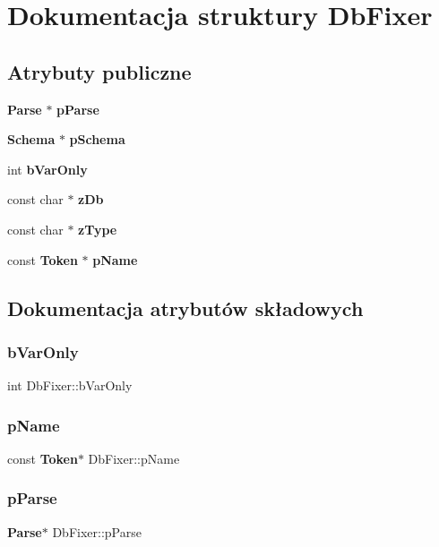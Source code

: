 \section{Dokumentacja struktury Db\+Fixer}
\label{struct_db_fixer}
\subsection*{Atrybuty publiczne}
\begin{DoxyCompactItemize}
\item 
\textbf{ Parse} $\ast$ \textbf{ p\+Parse}
\item 
\textbf{ Schema} $\ast$ \textbf{ p\+Schema}
\item 
int \textbf{ b\+Var\+Only}
\item 
const char $\ast$ \textbf{ z\+Db}
\item 
const char $\ast$ \textbf{ z\+Type}
\item 
const \textbf{ Token} $\ast$ \textbf{ p\+Name}
\end{DoxyCompactItemize}


\subsection{Dokumentacja atrybutów składowych}
\mbox{\label{struct_db_fixer_aebd8549176b84c8c71069ed4d77ad6af}} 
\subsubsection{bVarOnly}
{\footnotesize\ttfamily int Db\+Fixer\+::b\+Var\+Only}

\mbox{\label{struct_db_fixer_aedee20e10de7337651b84656ee81b39c}} 
\subsubsection{pName}
{\footnotesize\ttfamily const \textbf{ Token}$\ast$ Db\+Fixer\+::p\+Name}

\mbox{\label{struct_db_fixer_ac5c9b8bca3b05a66faea11dd998bf6f6}} 
\subsubsection{pParse}
{\footnotesize\ttfamily \textbf{ Parse}$\ast$ Db\+Fixer\+::p\+Parse}

